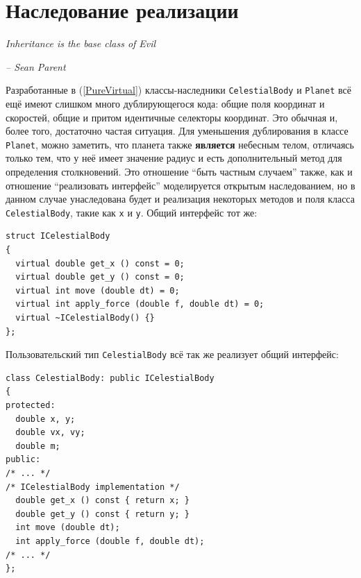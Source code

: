 \documentclass[a4paper,12pt,oneside]{book}
\newif\ifanswers
\begin{document}
\ifanswers
Правильный ответ: именно конструктор делает ту работу, которая должна быть сделана чтобы заработал механизм виртуальных функций. Поэтому в конструкторе класса виртуальные вызовы работают как не виртуальные. Поэтому даже если бы можно было сделать конструктор виртуальным, его вызов все равно был бы вызовом невиртуальной функции.
\fi

\pagebreak
\section{Наследование реализации}\label{ImplInheritance}

\hfill\textit{Inheritance is the base class of Evil} {\vspace{0.5em}}

\hfill\textit{-- Sean Parent}

Разработанные в (\ref{PureVirtual}) классы-наследники \lstinline!CelestialBody! и \lstinline!Planet! всё ещё имеют слишком много дублирующегося кода: общие поля координат и скоростей, общие и притом идентичные селекторы координат. Это обычная и, более того, достаточно частая ситуация. Для уменьшения дублирования в классе \lstinline!Planet!, можно заметить, что планета также \textbf{является} небесным телом, отличаясь только тем, что у неё имеет значение радиус и есть дополнительный метод для определения столкновений. Это отношение ``быть частным случаем'' также, как и отношение ``реализовать интерфейс'' моделируется открытым наследованием, но в данном случае унаследована будет и реализация некоторых методов и поля класса \lstinline!CelestialBody!, такие как \lstinline!x! и \lstinline!y!. Общий интерфейс тот же:

\begin{lstlisting}
struct ICelestialBody
{
  virtual double get_x () const = 0;
  virtual double get_y () const = 0;
  virtual int move (double dt) = 0;
  virtual int apply_force (double f, double dt) = 0;
  virtual ~ICelestialBody() {}
};
\end{lstlisting}

Пользовательский тип \lstinline!CelestialBody! всё так же реализует общий интерфейс:

\begin{lstlisting}
class CelestialBody: public ICelestialBody
{
protected:
  double x, y;
  double vx, vy;
  double m;
public:
/* ... */
/* ICelestialBody implementation */
  double get_x () const { return x; }
  double get_y () const { return y; }
  int move (double dt); 
  int apply_force (double f, double dt);
/* ... */
};
\end{lstlisting}
\end{document}
